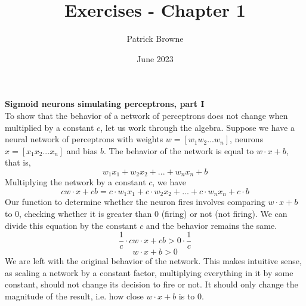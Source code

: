 \documentclass[12pt]{article}
\title{Exercises - Chapter 1}
\author{Patrick Browne}
\date{June 2023}
\begin{document}
\maketitle

\noindent
\textbf{Sigmoid neurons simulating perceptrons, part I} \\
To show that the behavior of a network of perceptrons does not change when
multiplied by a constant $c$, let us work through the algebra. Suppose we have
a neural network of perceptrons with weights $w = [w_1 w_2 ... w_n]$, neurons $x
= [x_1 x_2 ... x_n]$ and bias $b$. The behavior of the network is equal to $w
\cdot x + b$, that is,
\begin{equation*}
    w_1x_1 + w_2x_2 + ... + w_nx_n + b
\end{equation*}
Multiplying the network by a constant $c$, we have
\begin{equation*}
    cw \cdot x + cb = c \cdot w_1x_1 + c \cdot w_2x_2 + ... + c \cdot w_nx_n 
    + c \cdot b
\end{equation*}
Our function to determine whether the neuron fires involves comparing $w \cdot
x + b$ to 0, checking whether it is greater than 0 (firing) or not (not firing).
We can divide this equation by the constant $c$ and the behavior remains the
same.
\begin{equation*}
    \frac{1}{c} \cdot cw \cdot x + cb > 0 \cdot \frac{1}{c}
\end{equation*}
\begin{equation*}
    w \cdot x + b > 0
\end{equation*}
We are left with the original behavior of the network. This makes intuitive
sense, as scaling a network by a constant factor, multiplying everything in it
by some constant, should not change its decision to fire or not. It should only
change the magnitude of the result, i.e. how close $w \cdot x + b$ is to 0.
\end{document}
